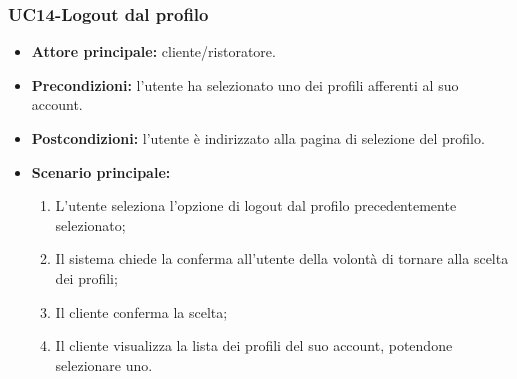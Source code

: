 \subsubsection{UC14-Logout dal profilo}
\begin{itemize}
\item \textbf{Attore principale:} cliente/ristoratore.
\item \textbf{Precondizioni:} l'utente ha selezionato uno dei profili afferenti al suo account.
\item \textbf{Postcondizioni:} l'utente è indirizzato alla pagina di selezione del profilo.
\item \textbf{Scenario principale:}
\begin{enumerate}
    \item L'utente seleziona l'opzione di logout dal profilo precedentemente selezionato;
    \item Il sistema chiede la conferma all'utente della volontà di tornare alla scelta dei profili;
    \item Il cliente conferma la scelta;
    \item Il cliente visualizza la lista dei profili del suo account, potendone selezionare uno.
\end{enumerate}
\end{itemize}
